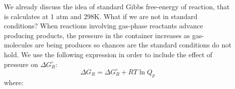 \documentclass[main.tex]{subfiles}
\newcommand\chapterlabel{entropy}
\begin{document}
\begin{description}
\item[] We already discuss the idea of standard Gibbs free-energy of reaction, that is calculates at 1 atm and 298K. What if we are not in standard conditions? When reactions involving gas-phase reactants advance producing products, the pressure in the container increases as gas-molecules are being produces so chances are the standard conditions do not hold. We use the following expression in order to include the effect of pressure on $\Delta G^{\circ}_R$:
\begin{equation}
\boxed{ \Delta G_R= \Delta G^{\circ}_R + RT\ln Q_p	}\label{\chapterlabel:equation11}
\end{equation}
where:


\end{description}
\end{document}

